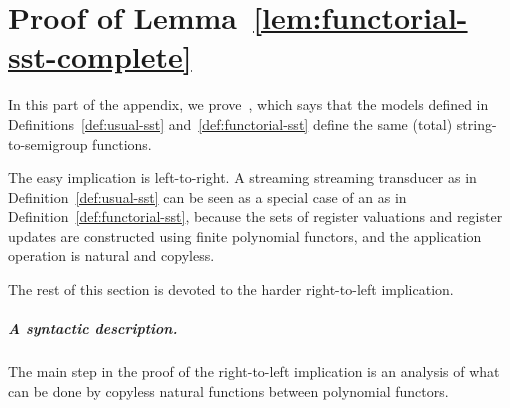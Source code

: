 \section{Proof of Lemma~\ref{lem:functorial-sst-complete}}
In this part of the appendix, we prove~, which says that the models defined in Definitions~\ref{def:usual-sst} and~\ref{def:functorial-sst} define the same (total) string-to-semigroup functions.

The easy implication is left-to-right. 
    A streaming streaming transducer as in Definition~\ref{def:usual-sst} can be seen as a special case of an \sst as in Definition~\ref{def:functorial-sst}, because the sets of register valuations and register updates are constructed using finite polynomial functors, and the application operation is natural and copyless. 

The rest of this section is devoted to the harder right-to-left implication. 

\subparagraph*{A syntactic description.} The main step in the proof of the right-to-left implication is an analysis of what can be done by copyless natural functions between polynomial functors.



